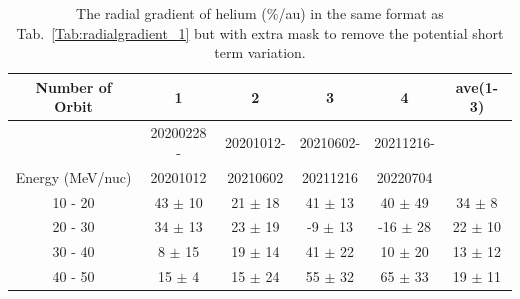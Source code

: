 \begin{table}[!htb]
    \centering

    \begin{tabular}{|c|c|c|c|c|c|}
    \hline
    Number of Orbit     & 1               & 2              & 3               & 4  & ave(1-3)\\
    \hline
                        &20200228 -      & 20201012-        & 20210602-    &  20211216-   &\\  
    Energy (MeV/nuc)    & 20201012        &  20210602       & 20211216      &  20220704  & \\
    \hline
    10 - 20 &  43 $\pm$ 10 & 21 $\pm$ 18 & 41 $\pm$ 13 & 40 $\pm$ 49  & 34 $\pm$ 8\\
    \hline
    20 - 30 &  34 $\pm$ 13 & 23 $\pm$ 19 & -9 $\pm$ 13 & -16 $\pm$ 28  & 22 $\pm$ 10\\
    \hline
    30 - 40 &  8 $\pm$ 15 & 19 $\pm$ 14 & 41 $\pm$ 22 & 10 $\pm$ 20 & 13 $\pm$ 12\\
    \hline
    40 - 50 &  15 $\pm$ 4 & 15 $\pm$ 24 & 55 $\pm$ 32 & 65 $\pm$ 33 & 19 $\pm$ 11\\
    \hline
    \end{tabular}
    \caption[Table of helium radial gradient with extra mask]{The radial gradient of helium (\%/au) in the same format as Tab.~\ref{Tab:radialgradient_1} but with extra mask to remove the potential short term variation. }
    \label{Tab:radialgradient_2}
\end{table}











%
